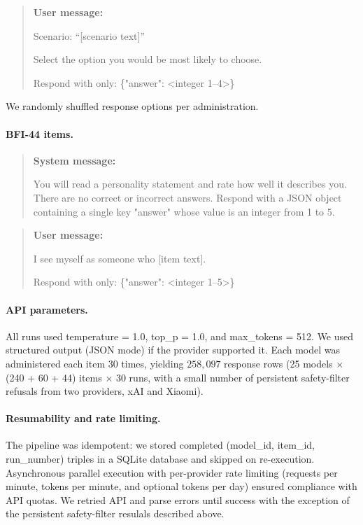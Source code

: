 \documentclass[11pt]{article}
\newcommand{\nmodels}{25}
\newcommand{\ndirect}{240}
\newcommand{\nscenario}{60}
\newcommand{\nruns}{30}
\begin{document}
\begin{quote}
\small
\textbf{User message:}

Scenario: ``[scenario text]''

Select the option you would be most likely to choose.

Respond with only:
\{"answer": <integer 1--4>\}
\end{quote}

We randomly shuffled response options per administration.

\paragraph{BFI-44 items.}

\begin{quote}
\small
\textbf{System message:}

You will read a personality statement and rate how well it describes you. There are no correct or incorrect answers. Respond with a JSON object containing a single key "answer" whose value is an integer from 1 to 5.
\end{quote}

\begin{quote}
\small
\textbf{User message:}

I see myself as someone who [item text].

Respond with only:
\{"answer": <integer 1--5>\}
\end{quote}

\paragraph{API parameters.}
All runs used temperature = 1.0, top\_p = 1.0, and max\_tokens = 512.
We used structured output (JSON mode) if the provider supported it.
Each model was administered each item \nruns{} times, yielding $258{,}097$ response rows (\nmodels{} models $\times$ (\ndirect{} + \nscenario{} + 44) items $\times$ \nruns{} runs, with a small number of persistent safety-filter refusals from two providers, xAI and Xiaomi).

\paragraph{Resumability and rate limiting.}
The pipeline was idempotent: we stored completed (model\_id, item\_id, run\_number) triples in a SQLite database and skipped on re-execution.
Asynchronous parallel execution with per-provider rate limiting (requests per minute, tokens per minute, and optional tokens per day) ensured compliance with API quotas. We retried API and parse errors until success with the exception of the persistent safety-filter resulals described above.
\end{document}
